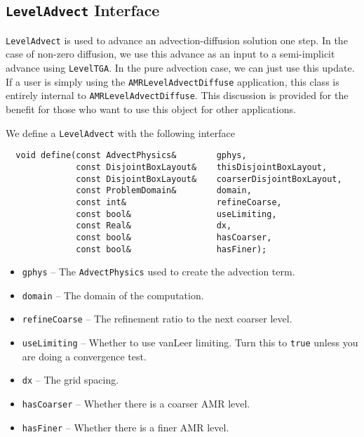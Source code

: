 \subsection{{\tt LevelAdvect} Interface}
\verb|LevelAdvect| is used to advance an advection-diffusion solution one
step.   In the case of non-zero diffusion, we use this advance as an
input to a semi-implicit advance using \verb|LevelTGA|.   In the pure
advection case, we can just use this update.  If a user is simply
using the \verb|AMRLevelAdvectDiffuse| application, this class is entirely
internal to \verb|AMRLevelAdvectDiffuse|.   This discussion is provided for
the benefit for those who want to use this object for other
applications. 

We define a \verb|LevelAdvect| with the following interface
\begin{small}
\begin{verbatim}
  void define(const AdvectPhysics&        gphys,
              const DisjointBoxLayout&    thisDisjointBoxLayout,
              const DisjointBoxLayout&    coarserDisjointBoxLayout,
              const ProblemDomain&        domain,
              const int&                  refineCoarse,
              const bool&                 useLimiting,
              const Real&                 dx,
              const bool&                 hasCoarser,
              const bool&                 hasFiner);

\end{verbatim}
\end{small}
\begin{itemize}
\item \verb|gphys| -- The \verb|AdvectPhysics| used to create the advection term.  
\item \verb|domain| -- The domain of the computation.
\item \verb|refineCoarse| -- The refinement ratio to the next coarser level.
\item \verb|useLimiting| -- Whether to use vanLeer limiting.  Turn this to
  \verb|true| unless you are doing a convergence test.
\item \verb|dx| -- The grid spacing.
\item \verb|hasCoarser| -- Whether there is a coarser AMR level.
\item \verb|hasFiner| -- Whether there is a finer AMR level.
\end{itemize}

